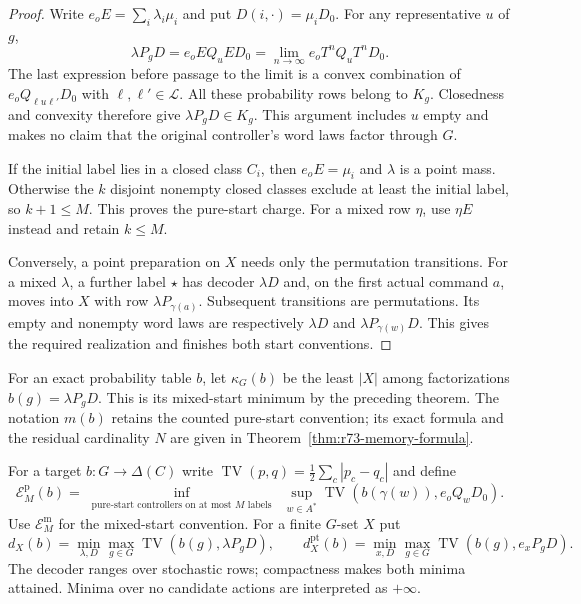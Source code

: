 \begin{proof}
Write $e_oE=\sum_i\lambda_i\mu_i$ and put $D(i,\cdot)=\mu_iD_0$.
For any representative $u$ of $g$,
\[
 \lambda P_gD=e_oEQ_uED_0
             =\lim_{n\to\infty}e_oT^nQ_uT^nD_0.
\]
The last expression before passage to the limit is a convex combination
of $e_oQ_{\ell u\ell'}D_0$ with $\ell,\ell'\in\mathcal L$.
All these probability rows belong to $K_g$. Closedness and convexity
therefore give $\lambda P_gD\in K_g$. This argument includes $u$
empty and makes no claim that the original controller's word laws
factor through $G$.

If the initial label lies in a closed class $C_i$, then $e_oE=\mu_i$
and $\lambda$ is a point mass. Otherwise the $k$ disjoint nonempty
closed classes exclude at least the initial label, so $k+1\le M$.
This proves the pure-start charge. For a mixed row $\eta$, use
$\eta E$ instead and retain $k\le M$.

Conversely, a point preparation on $X$ needs only the permutation
transitions. For a mixed $\lambda$, a further label $\star$ has decoder
$\lambda D$ and, on the first actual command $a$, moves into $X$ with
row $\lambda P_{\gamma(a)}$. Subsequent transitions are permutations.
Its empty and nonempty word laws are respectively $\lambda D$ and
$\lambda P_{\gamma(w)}D$. This gives the required realization and
finishes both start conventions.
\end{proof}

For an exact probability table $b$, let $\kappa_G(b)$ be the least
$|X|$ among factorizations $b(g)=\lambda P_gD$. This is its mixed-start
minimum by the preceding theorem. The notation $m(b)$ retains the
counted pure-start convention; its exact formula and the residual
cardinality $N$ are given in Theorem~\ref{thm:r73-memory-formula}.

For a target $b:G\to\Delta(C)$ write
$\operatorname{TV}(p,q)=\tfrac12\sum_c|p_c-q_c|$ and define
\[
 \mathcal E_M^{\mathrm p}(b)=
 \inf_{\substack{\text{pure-start controllers on at most }M\text{ labels}}}
 \ \sup_{w\in A^*}\operatorname{TV}
           (b(\gamma(w)),e_oQ_wD_0).
\]
Use $\mathcal E_M^{\mathrm m}$ for the mixed-start convention.
For a finite $G$-set $X$ put
\[
 d_X(b)=\min_{\lambda,D}\max_{g\in G}
          \operatorname{TV}(b(g),\lambda P_gD),\qquad
 d_X^{\mathrm{pt}}(b)=\min_{x,D}\max_{g\in G}
          \operatorname{TV}(b(g),e_xP_gD).
\]
The decoder ranges over stochastic rows; compactness makes both minima
attained. Minima over no candidate actions are interpreted as $+\infty$.

